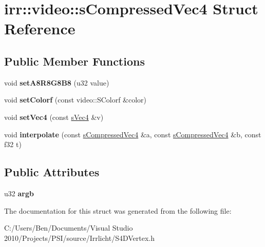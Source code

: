 \hypertarget{structirr_1_1video_1_1s_compressed_vec4}{\section{irr\-:\-:video\-:\-:s\-Compressed\-Vec4 Struct Reference}
\label{structirr_1_1video_1_1s_compressed_vec4}
}
\subsection*{Public Member Functions}
\begin{DoxyCompactItemize}
\item 
\hypertarget{structirr_1_1video_1_1s_compressed_vec4_ab1b6cfe36415d957cbc9d5f935ffef55}{void {\bfseries set\-A8\-R8\-G8\-B8} (u32 value)}\label{structirr_1_1video_1_1s_compressed_vec4_ab1b6cfe36415d957cbc9d5f935ffef55}

\item 
\hypertarget{structirr_1_1video_1_1s_compressed_vec4_a20569f57c9874553fb6227caad99eed0}{void {\bfseries set\-Colorf} (const video\-::\-S\-Colorf \&color)}\label{structirr_1_1video_1_1s_compressed_vec4_a20569f57c9874553fb6227caad99eed0}

\item 
\hypertarget{structirr_1_1video_1_1s_compressed_vec4_a0790549be739d8ab53bd773160593f93}{void {\bfseries set\-Vec4} (const \hyperlink{structirr_1_1video_1_1s_vec4}{s\-Vec4} \&v)}\label{structirr_1_1video_1_1s_compressed_vec4_a0790549be739d8ab53bd773160593f93}

\item 
\hypertarget{structirr_1_1video_1_1s_compressed_vec4_aa3a163433ec9e0ef74e32837db8a664a}{void {\bfseries interpolate} (const \hyperlink{structirr_1_1video_1_1s_compressed_vec4}{s\-Compressed\-Vec4} \&a, const \hyperlink{structirr_1_1video_1_1s_compressed_vec4}{s\-Compressed\-Vec4} \&b, const f32 t)}\label{structirr_1_1video_1_1s_compressed_vec4_aa3a163433ec9e0ef74e32837db8a664a}

\end{DoxyCompactItemize}
\subsection*{Public Attributes}
\begin{DoxyCompactItemize}
\item 
\hypertarget{structirr_1_1video_1_1s_compressed_vec4_a8c7576ee05ca2838c1dc4c3c2ef767e7}{u32 {\bfseries argb}}\label{structirr_1_1video_1_1s_compressed_vec4_a8c7576ee05ca2838c1dc4c3c2ef767e7}

\end{DoxyCompactItemize}


The documentation for this struct was generated from the following file\-:\begin{DoxyCompactItemize}
\item 
C\-:/\-Users/\-Ben/\-Documents/\-Visual Studio 2010/\-Projects/\-P\-S\-I/source/\-Irrlicht/S4\-D\-Vertex.\-h\end{DoxyCompactItemize}
